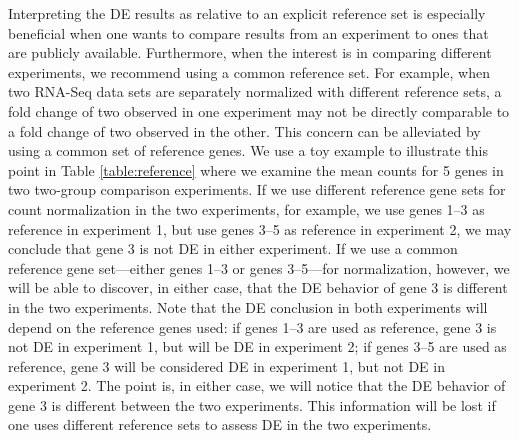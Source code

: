 \documentclass[letterpaper,12pt]{article}
\begin{document}
Interpreting the DE results as relative to an explicit reference set is
especially beneficial when one wants to compare results from an experiment to ones that are publicly available. 
Furthermore, when the interest is in comparing different experiments, we recommend using a common reference set. 
For example, when two RNA-Seq data sets are separately
normalized with different reference sets, a fold change of two observed in one
experiment may not be directly comparable to a fold change of two observed in
the other.  This concern can be alleviated by using a common set of reference
genes.  We use a toy example to illustrate this point in Table
\ref{table:reference} where we examine the mean counts for 5 genes in two
two-group comparison experiments. If we use different reference gene sets for
 count normalization in the two experiments, for example, we use genes 1--3 as reference in experiment
1, but use genes 3--5 as reference in experiment 2, we may conclude that gene
3 is not DE in either experiment. If we use a common reference gene
set---either genes 1--3 or genes 3--5---for normalization, however, we will be
able to discover, in either case, that the DE behavior of gene 3 is different
in the two experiments. Note that the DE conclusion in both experiments will
depend on the reference genes used: if genes 1--3 are used as reference, gene
3 is not DE in experiment 1, but will be DE in experiment 2; if genes 3--5 are
used as reference, gene 3 will be considered DE in experiment 1, but not DE in
experiment 2. The point is, in either case, we will notice that the DE
behavior of gene 3 is different between the two experiments. This information
will be lost if one uses different reference sets to assess DE in the two
experiments.


%
\end{document}
